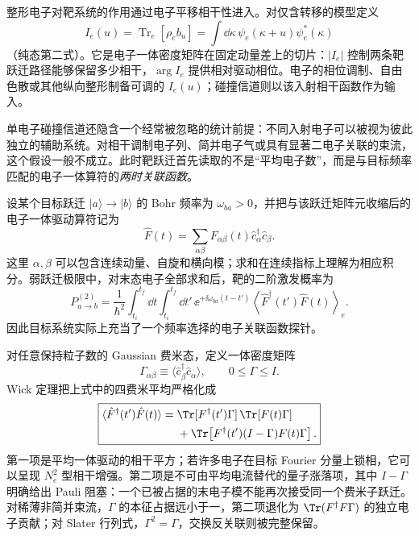 整形电子对靶系统的作用通过电子平移相干性进入。对仅含转移的模型定义
\begin{equation*}
I_e(u)=\operatorname{Tr}_e[\rho_e b_u]
=\int\dd \kappa\,\psi_e(\kappa+u)\psi_e^*(\kappa)
\end{equation*}
（纯态第二式）。它是电子一体密度矩阵在固定动量差上的切片：$|I_e|$ 控制两条靶跃迁路径能够保留多少相干，$\arg I_e$ 提供相对驱动相位。电子的相位调制、自由色散或其他纵向整形制备可调的 $I_e(u)$；碰撞信道则以该入射相干函数作为输入。

单电子碰撞信道还隐含一个经常被忽略的统计前提：不同入射电子可以被视为彼此独立的辅助系统。对相干调制电子列、简并电子气或具有显著二电子关联的束流，这个假设一般不成立。此时靶跃迁首先读取的不是“平均电子数”，而是与目标频率匹配的电子一体算符的\emph{两时关联函数}。

设某个目标跃迁 $|a\rangle\to|b\rangle$ 的 Bohr 频率为 $\omega_{ba}>0$，并把与该跃迁矩阵元收缩后的电子一体驱动算符记为
\begin{equation}
\boxed{
\hat F(t)
=\sum_{\alpha\beta}F_{\alpha\beta}(t)
\hat c_\alpha^\dagger\hat c_\beta .}
\label{eq:fermionic_beam_onebody_drive_operator}
\end{equation}
这里 $\alpha,\beta$ 可以包含连续动量、自旋和横向模；求和在连续指标上理解为相应积分。弱跃迁极限中，对末态电子全部求和后，靶的二阶激发概率为
\begin{equation}
\boxed{
P_{a\to b}^{(2)}
=\frac{1}{\hbar^2}
\int_{t_i}^{t_f}\dd t\int_{t_i}^{t_f}\dd t'\,
\ee^{+\ii\omega_{ba}(t-t')}
\left\langle
\hat F^\dagger(t')\hat F(t)
\right\rangle_e .}
\label{eq:target_excitation_fermionic_beam_correlator}
\end{equation}
因此目标系统实际上充当了一个频率选择的电子关联函数探针。

对任意保持粒子数的 Gaussian 费米态，定义一体密度矩阵
\begin{equation*}
\Gamma_{\alpha\beta}
\equiv
\langle \hat c_\beta^\dagger\hat c_\alpha\rangle,
\qquad
0\le\Gamma\le I .
\end{equation*}
Wick 定理把上式中的四费米平均严格化成
\begin{equation}
\boxed{
\begin{aligned}
\langle\hat F^\dagger(t')\hat F(t)\rangle
={}&
\Tr[F^\dagger(t')\Gamma]\,
\Tr[F(t)\Gamma]\\
&+\Tr\!\left[
F^\dagger(t')(I-\Gamma)F(t)\Gamma
\right].
\end{aligned}}
\label{eq:fermionic_beam_coherent_incoherent_split}
\end{equation}
第一项是平均一体驱动的相干平方；若许多电子在目标 Fourier 分量上锁相，它可以呈现 $N_e^2$ 型相干增强。第二项是不可由平均电流替代的量子涨落项，其中 $I-\Gamma$ 明确给出 Pauli 阻塞：一个已被占据的末电子模不能再次接受同一个费米子跃迁。对稀薄非简并束流，$\Gamma$ 的本征占据远小于一，第二项退化为 $\Tr(F^\dagger F\Gamma)$ 的独立电子贡献；对 Slater 行列式，$\Gamma^2=\Gamma$，交换反关联则被完整保留。

